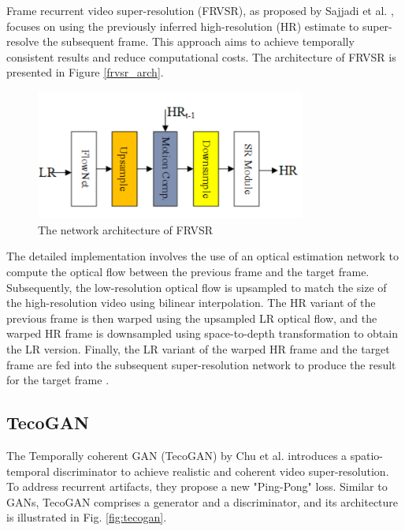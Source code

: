 \documentclass[conference]{IEEEtran}
\begin{document}
Frame recurrent video super-resolution (FRVSR), as proposed by Sajjadi et al. \cite{frvsr_2018}, focuses on using the previously inferred high-resolution (HR) estimate to super-resolve the subsequent frame. This approach aims to achieve temporally consistent results and reduce computational costs. The architecture of FRVSR is presented in Figure \ref{frvsr_arch}.

\begin{figure}[htb]
    \centering
    \centerline{\includegraphics[width=8.9cm]{frvsr_arch}}
    \caption{The network architecture of FRVSR \cite{video_super_resolution_survey_2020}}
    \label{fig:frvsr_arch}
\end{figure}

The detailed implementation involves the use of an optical estimation network to compute the optical flow between the previous frame and the target frame. Subsequently, the low-resolution optical flow is upsampled to match the size of the high-resolution video using bilinear interpolation. The HR variant of the previous frame is then warped using the upsampled LR optical flow, and the warped HR frame is downsampled using space-to-depth transformation to obtain the LR version. Finally, the LR variant of the warped HR frame and the target frame are fed into the subsequent super-resolution network to produce the result for the target frame \cite{video_super_resolution_survey_2020}.

\subsection{TecoGAN}

The Temporally coherent GAN (TecoGAN) by Chu et al. \cite{tecogan_2018} introduces a spatio-temporal discriminator to achieve realistic and coherent video super-resolution. To address recurrent artifacts, they propose a new "Ping-Pong" loss. Similar to GANs, TecoGAN comprises a generator and a discriminator, and its architecture is illustrated in Fig. \ref{fig:tecogan}.
\end{document}
